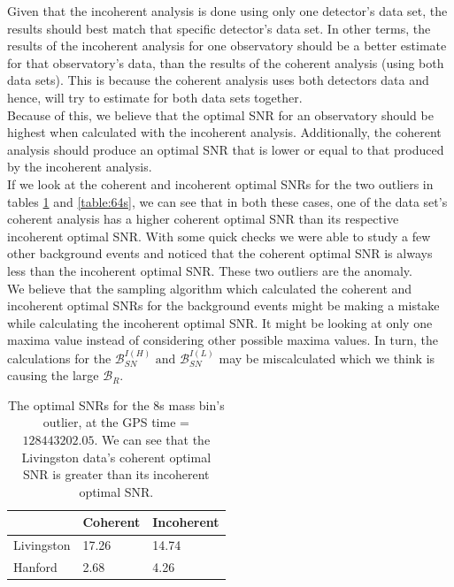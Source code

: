 \documentclass{article}
\begin{document}
 
 
 
 Given that the incoherent analysis is done using only one detector's data set, the results should best match that specific detector's data set. In other terms, the results of the incoherent analysis for one observatory should be a better estimate for that observatory's data, than the results of the coherent analysis (using both data sets). This is because the coherent analysis uses both detectors data and hence, will try to estimate for both data sets together. \\
 
 Because of this, we believe that the optimal SNR for an observatory should be highest when calculated with the incoherent analysis. Additionally, the coherent analysis should produce an optimal SNR that is lower or equal to that produced by the incoherent analysis.\\
 
 If we look at the coherent and incoherent optimal SNRs for the two outliers in tables \ref{table:8s} and \ref{table:64s}, we can see that in both these cases, one of the data set's coherent analysis has a higher coherent optimal SNR than its respective incoherent optimal SNR. With some quick checks we were able to study a few other background events and noticed that the coherent optimal SNR is always less than the incoherent optimal SNR. These two outliers are the anomaly. \\
 
 We believe that the sampling algorithm which calculated the coherent and incoherent optimal SNRs for the background events might be making a mistake while calculating the incoherent optimal SNR. It might be looking at only one maxima value instead of considering other possible maxima values. In turn, the calculations for the $\mathcal{B}_{SN}^{I(H)}\text{ and }\mathcal{B}_{SN}^{I(L)}$ may be miscalculated which we think is causing the large $\mathcal{B}_{R}$.
 
 \begin{table}[h!]
 	\centering
 	\caption{The optimal SNRs for the 8s mass bin's outlier, at the GPS time = $128443202.05$. We can see that the Livingston data's coherent optimal SNR is greater than its incoherent optimal SNR.}
 	\label{table:8s}
 	\begin{tabular}{|l|ll|}
 		\hline
 		& \textbf{Coherent} & \textbf{Incoherent} \\ \hline
 		Livingston & 17.26             & 14.74               \\
 		Hanford    & 2.68              & 4.26                \\ \hline
 	\end{tabular}
 \end{table}
 
\end{document}
